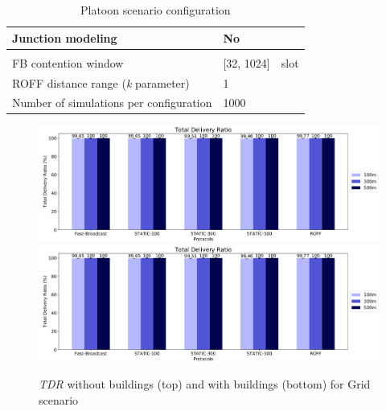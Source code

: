 \begin{table}[H]
\begin{tabularx}{\textwidth}{l | l  l}
				Junction modeling						& No					&		\\
				\midrule[1pt]
				\rowcolor{P} \multicolumn{3}{c}{Protocols configuration} \\
				\midrule[1pt]
				FB contention window					& [32, 1024]			& slot	\\
				ROFF distance range (\textit{k} parameter) & 1					&		\\	
				\midrule[1pt]
				Number of simulations per configuration	& 1000					&		\\
				\bottomrule
			\end{tabularx}
			\caption{Platoon scenario configuration}
			\label{tab:grid}
		\end{table}
	
		\begin{figure}[H]
			\centering
			\includegraphics[width=1.0\textwidth]{immagini/grid-300/b0/tdr}
			\includegraphics[width=1.0\textwidth]{immagini/grid-300/b1/tdr}
			\caption{\textit{TDR} without buildings (top) and with buildings (bottom) for Grid scenario}
			\label{fig:grid-tdr}
		\end{figure}
		
